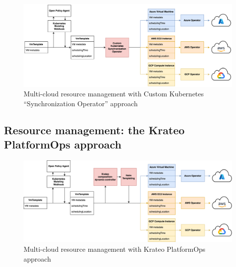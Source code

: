 \begin{figure}[t]
  \centering
  \includegraphics[width=1\linewidth]{images/k8s_operator.png}
  \caption{Multi-cloud resource management with Custom Kubernetes ``Synchronization Operator'' approach}
  \label{fig:k8s_operator}
\end{figure}

\subsection{Resource management: the Krateo PlatformOps approach}

\begin{figure}[t]
  \centering
  \includegraphics[width=1\linewidth]{images/krateo.png}
  \caption{Multi-cloud resource management with Krateo PlatformOps approach}
  \label{fig:krateo}
\end{figure}

